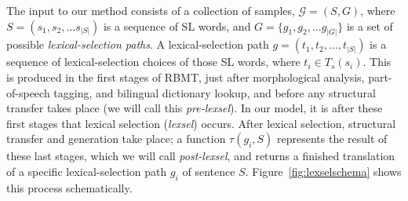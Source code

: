 \documentclass[11pt]{article}
\begin{document}
The input to our method consists of a collection of samples,
$\mathcal{G} = (S, G)$, where $S = (s_1, s_2, \ldots s_{|S|})$ is a
sequence of SL words, and $G = \{g_1, g_2, \ldots g_{|G|}\}$ is a set
of possible \emph{lexical-selection paths}. A lexical-selection path
$g = (t_1, t_2, \ldots, t_{|S|})$ is a sequence of lexical-selection
choices of those SL words, where \(t_i \in
T_s(s_i)\). %
This is produced in the first stages of RBMT, just after morphological
analysis, part-of-speech tagging, and bilingual dictionary lookup, and
before any structural transfer takes place (we will call this
\emph{pre-lexsel}). In our model, it is after these first stages that
lexical selection (\emph{lexsel}) occurs. After lexical selection,
structural transfer and generation take place; a function
$\tau(g_i,S)$ represents the result of these last stages, which we
will call \emph{post-lexsel}, and returns a finished translation of a
specific lexical-selection path $g_i$ of sentence
$S$. Figure~\ref{fig:lexselschema} shows this process
schematically. %

\end{document}
